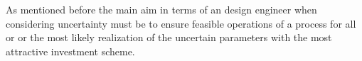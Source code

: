 As mentioned before the main aim in terms of an design engineer when considering uncertainty must 
be to ensure feasible operations of a process for all or or the most likely realization of the uncertain 
parameters with the most attractive investment scheme. 















